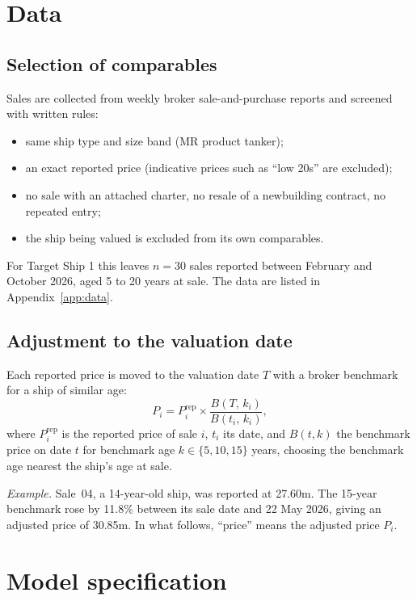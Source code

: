 \documentclass[11pt,a4paper]{article}
\newcommand{\usd}[1]{\text{US\$}#1}
\begin{document}
\section{Data}

\subsection{Selection of comparables}

Sales are collected from weekly broker sale-and-purchase reports and screened with written rules:
\begin{itemize}
\item same ship type and size band (MR product tanker);
\item an exact reported price (indicative prices such as ``low \usd{20}s'' are excluded);
\item no sale with an attached charter, no resale of a newbuilding contract, no repeated entry;
\item the ship being valued is excluded from its own comparables.
\end{itemize}
For Target Ship 1 this leaves $n = 30$ sales reported between February and October 2026, aged 5 to 20 years at sale. The data are listed in Appendix~\ref{app:data}.

\subsection{Adjustment to the valuation date}

Each reported price is moved to the valuation date $T$ with a broker benchmark for a ship of similar age:
\begin{equation}
\label{eq:index}
P_i = P_i^{\text{rep}} \times \frac{B(T,\,k_i)}{B(t_i,\,k_i)},
\end{equation}
where $P_i^{\text{rep}}$ is the reported price of sale $i$, $t_i$ its date, and $B(t,k)$ the benchmark price on date $t$ for benchmark age $k \in \{5, 10, 15\}$ years, choosing the benchmark age nearest the ship's age at sale.

\emph{Example.} Sale~04, a 14-year-old ship, was reported at \usd{27.60}m. The 15-year benchmark rose by 11.8\% between its sale date and 22 May 2026, giving an adjusted price of \usd{30.85}m.
In what follows, ``price'' means the adjusted price $P_i$.

\section{Model specification}
\end{document}
